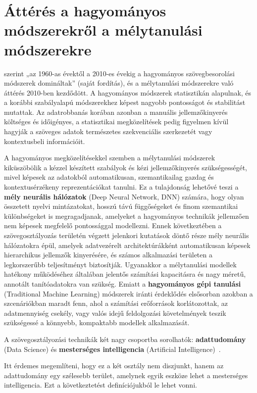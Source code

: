 \section{Áttérés a hagyományos módszerekről a mélytanulási módszerekre}

\cite{li2022surveytextclassification} szerint „az 1960-as évektől a 2010-es évekig a hagyományos szövegbesorolási módszerek domináltak” (saját fordítás), és a mélytanulási módszerekre való áttérés 2010-ben kezdődött. A hagyományos módszerek statisztikán alapulnak, és a korábbi szabályalapú módszerekhez képest nagyobb pontosságot és stabilitást mutattak. Az adatrobbanás korában azonban a manuális jellemzőkinyerés költséges és időigényes, a statisztikai megközelítések pedig figyelmen kívül hagyják a szöveges adatok természetes szekvenciális szerkezetét vagy kontextusbeli információit.

A hagyományos megközelítésekkel szemben a mélytanulási módszerek kiküszöbölik a kézzel készített szabályok és kézi jellemzőkinyerés szükségességét, mivel képesek az adatokból automatikusan, szemantikailag gazdag és kontextusérzékeny reprezentációkat tanulni. Ez a tulajdonság lehetővé teszi a \textbf{mély neurális hálózatok} (Deep Neural Network, DNN) számára, hogy olyan összetett nyelvi mintázatokat, hosszú távú függőségeket és finom szemantikai különbségeket is megragadjanak, amelyeket a hagyományos technikák jellemzően nem képesek megfelelő pontossággal modellezni. Ennek következtében a szövegosztályozás területén végzett jelenkori kutatások döntő része mély neurális hálózatokra épül, amelyek adatvezérelt architektúrákként automatikusan képesek hierarchikus jellemzők kinyerésére, és számos alkalmazási területen a legkorszerűbb teljesítményt biztosítják. Ugyanakkor a mélytanulási modellek hatékony működéséhez általában jelentős számítási kapacitásra és nagy méretű, annotált tanítóadatokra van szükség. Emiatt a \textbf{hagyományos gépi tanulási} (Traditional Machine Learning) módszerek iránti érdeklődés elsősorban azokban a szcenáriókban maradt fenn, ahol a számítási erőforrások korlátozottak, az adatmennyiség csekély, vagy valós idejű feldolgozási követelmények teszik szükségessé a könnyebb, kompaktabb modellek alkalmazását.

A szövegosztályozási technikák két nagy csoportba sorolhatók: \textbf{adattudomány} (Data Science) és \textbf{mesterséges intelligencia} (Artificial Intelligence)~\cite{taha2024textclassificationsurvey}.

Itt érdemes megemlíteni, hogy ez a két osztály nem diszjunkt, hanem az adattudomány egy szélesebb terület, amelynek egyik eszköze lehet a mesterséges intelligencia. Ezt a következtetést definíciójukból le lehet vonni.


